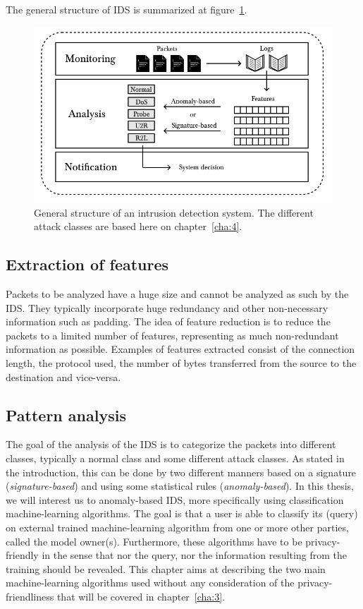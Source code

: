 The general structure of IDS is summarized at figure~\ref{img:ids-model}.

\begin{figure}[t]
    \centering
    \includegraphics[width=.95\textwidth]{parts/chap-2/img-2/ids-model.jpg}
    \caption[Structure of an intrusion detection system]{General structure of an intrusion detection system. The different attack classes are based here on chapter~\ref{cha:4}.} 
    \label{img:ids-model}
\end{figure}

\subsection{Extraction of features}
Packets to be analyzed have a huge size and cannot be analyzed as such by the IDS. They typically incorporate huge redundancy and other non-necessary information such as padding. The idea of feature reduction is to reduce the packets to a limited number of features, representing as much non-redundant information as possible. Examples of features extracted consist of the connection length, the protocol used, the number of bytes transferred from the source to the destination and vice-versa.


\subsection{Pattern analysis}
The goal of the analysis of the IDS is to categorize the packets into different classes, typically a normal class and some different attack classes. As stated in the introduction, this can be done by two different manners based on a signature (\emph{signature-based}) and using some statistical rules (\emph{anomaly-based}). In this thesis, we will interest us to anomaly-based IDS, more specifically using classification machine-learning algorithms. The goal is that a user is able to classify its (query) on external trained machine-learning algorithm from one or more other parties, called the model owner(s). Furthermore, these algorithms have to be privacy-friendly in the sense that nor the query, nor the information resulting from the training should be revealed. This chapter aims at describing the two main machine-learning algorithms used without any consideration of the privacy-friendliness that will be covered in chapter~\ref{cha:3}.

\FloatBarrier